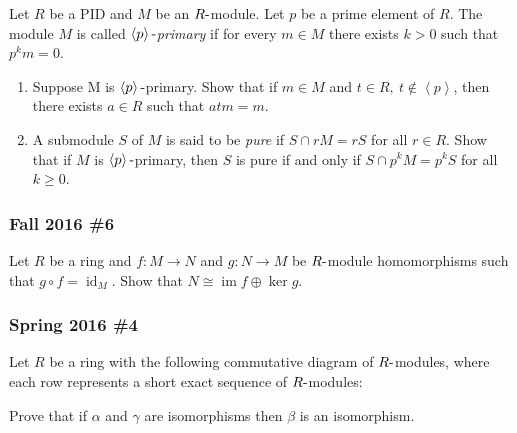 Let \(R\) be a PID and \(M\) be an \(R{\hbox{-}}\)module. Let \(p\) be a
prime element of \(R\). The module \(M\) is called
\emph{\(\left\langle{p}\right\rangle{\hbox{-}}\)primary} if for every
\(m \in M\) there exists \(k > 0\) such that \(p^k m = 0\).

\begin{enumerate}
\def\labelenumi{\alph{enumi}.}
\item
  Suppose M is \(\left\langle{p}\right\rangle{\hbox{-}}\)primary. Show
  that if \(m \in M\) and
  \(t \in R, ~t \not\in \left\langle{p}\right\rangle\), then there
  exists \(a \in R\) such that \(atm = m\).
\item
  A submodule \(S\) of \(M\) is said to be \emph{pure} if
  \(S \cap r M = rS\) for all \(r \in R\). Show that if \(M\) is
  \(\left\langle{p}\right\rangle{\hbox{-}}\)primary, then \(S\) is pure
  if and only if \(S \cap p^k M = p^k S\) for all \(k \geq 0\).
\end{enumerate}

\hypertarget{fall-2016-6}{%
\subsubsection{Fall 2016 \#6}\label{fall-2016-6}}

Let \(R\) be a ring and \(f: M\to N\) and \(g: N\to M\) be
\(R{\hbox{-}}\)module homomorphisms such that
\(g\circ f = \operatorname{id}_M\). Show that
\(N\cong \operatorname{im}f \oplus \ker g\).

\hypertarget{spring-2016-4}{%
\subsubsection{Spring 2016 \#4}\label{spring-2016-4}}

Let \(R\) be a ring with the following commutative diagram of
\(R{\hbox{-}}\)modules, where each row represents a short exact sequence
of \(R{\hbox{-}}\)modules:

\begin{center}
\end{center}

Prove that if \(\alpha\) and \(\gamma\) are isomorphisms then \(\beta\)
is an isomorphism.


